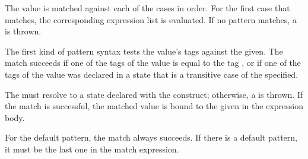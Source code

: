 \begin{quote}


 {}  

 {} 


 {}  





 {} 

\end{quote}

The value is matched against each of the cases in order.  For the
first case that matches, the corresponding expression list is
evaluated.  If no pattern matches, a  is
thrown.

The first kind of pattern syntax tests the value's tags against
the  given.  The match succeeds if
one of the tags of the value is equal to the tag
, or if one of the tags of the value
was declared in a state that is a transitive case of the
 specified.

The 
must resolve to a state declared with the  
construct; otherwise, a  is
thrown.  If the
match is successful, the matched value is bound to the
 given in the expression body.

  For the default pattern, the match always succeeds.  If
there is a default pattern, it must be the last one in the match
expression.


\begin{quote}




 {}  



 {} \alt {}




\end{quote}

